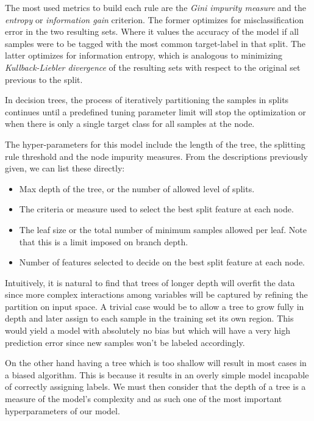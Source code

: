 The most used metrics to build each rule are the \textit{Gini impurity measure} and the \textit{entropy} or \textit{information gain} criterion. The former optimizes for misclassification error in the two resulting sets. Where it values the accuracy of the model if all samples were to be tagged with the most common target-label in that split. The latter optimizes for information entropy, which is analogous to minimizing \textit{Kullback-Liebler divergence} of the resulting sets with respect to the original set previous to the split.

In decision trees, the process of iteratively partitioning the samples in splits continues until a predefined tuning parameter limit will stop the optimization or when there is only a single target class for all samples at the node.

The hyper-parameters for this model include the length of the tree, the splitting rule threshold and the node impurity measures. From the descriptions previously given, we can list these directly:

\begin{itemize}
\item Max depth of the tree, or the number of allowed level of splits.
\item The criteria or measure used to select the best split feature at each node.
\item The leaf size or the total number of minimum samples allowed per leaf. Note that this is a limit imposed on branch depth.
\item Number of features selected to decide on the best split feature at each node.
\end{itemize}


Intuitively, it is natural to find that trees of longer depth will overfit the data since more complex interactions among variables will be captured by refining the partition on input space. A trivial case would be to allow a tree to grow fully in depth and later assign to each sample in the training set its own region. This would yield a model with absolutely no bias but which will have a very high prediction error since new samples won't be labeled accordingly.

On the other hand having a tree which is too shallow will result in most cases in a biased algorithm. This is because it results in an overly simple model incapable of correctly assigning labels. We must then consider that the depth of a tree is a measure of the model's complexity and as such one of the most important hyperparameters of our model.

